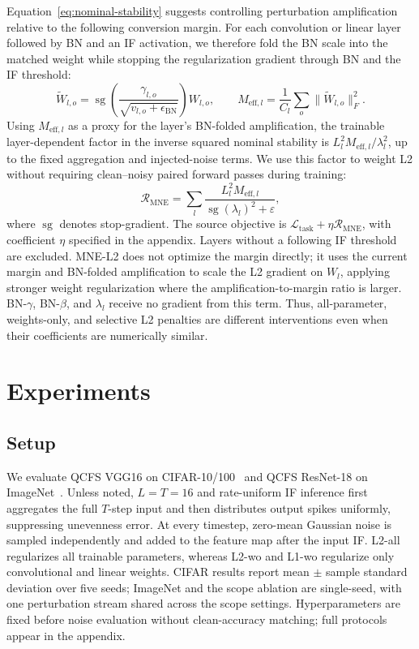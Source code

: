 \documentclass{article}
\begin{document}
Equation~\eqref{eq:nominal-stability} suggests controlling perturbation amplification relative to the following conversion margin. For each convolution or linear layer followed by BN and an IF activation, we therefore fold the BN scale into the matched weight while stopping the regularization gradient through BN and the IF threshold:
\begin{equation}
\widetilde W_{l,o}=
\operatorname{sg}\!\left(\frac{\gamma_{l,o}}{\sqrt{v_{l,o}+\epsilon_{\mathrm{BN}}}}\right)W_{l,o},
\qquad
M_{\mathrm{eff},l}=\frac{1}{C_l}\sum_o\|\widetilde W_{l,o}\|_F^2.
\label{eq:effective-weight}
\end{equation}
Using $M_{\mathrm{eff},l}$ as a proxy for the layer's BN-folded amplification, the trainable layer-dependent factor in the inverse squared nominal stability is $L_l^2M_{\mathrm{eff},l}/\lambda_l^2$, up to the fixed aggregation and injected-noise terms. We use this factor to weight L2 without requiring clean--noisy paired forward passes during training:
\begin{equation}
\mathcal{R}_{\mathrm{MNE}}=
\sum_l\frac{L_l^2 M_{\mathrm{eff},l}}
{\operatorname{sg}(\lambda_l)^2+\varepsilon},
\label{eq:mne}
\end{equation}
where $\operatorname{sg}$ denotes stop-gradient. The source objective is $\mathcal{L}_{\mathrm{task}}+\eta\mathcal{R}_{\mathrm{MNE}}$, with coefficient $\eta$ specified in the appendix. Layers without a following IF threshold are excluded. MNE-L2 does not optimize the margin directly; it uses the current margin and BN-folded amplification to scale the L2 gradient on $W_l$, applying stronger weight regularization where the amplification-to-margin ratio is larger. BN-$\gamma$, BN-$\beta$, and $\lambda_l$ receive no gradient from this term. Thus, all-parameter, weights-only, and selective L2 penalties are different interventions even when their coefficients are numerically similar.

\section{Experiments}

\subsection{Setup}

We evaluate QCFS VGG16 on CIFAR-10/100~\cite{krizhevsky2009learning} and QCFS ResNet-18 on ImageNet~\cite{deng2009imagenet,he2016deep}. Unless noted, $L=T=16$ and rate-uniform IF inference first aggregates the full $T$-step input and then distributes output spikes uniformly, suppressing unevenness error. At every timestep, zero-mean Gaussian noise is sampled independently and added to the feature map after the input IF. L2-all regularizes all trainable parameters, whereas L2-wo and L1-wo regularize only convolutional and linear weights. CIFAR results report mean $\pm$ sample standard deviation over five seeds; ImageNet and the scope ablation are single-seed, with one perturbation stream shared across the scope settings. Hyperparameters are fixed before noise evaluation without clean-accuracy matching; full protocols appear in the appendix.
\end{document}
